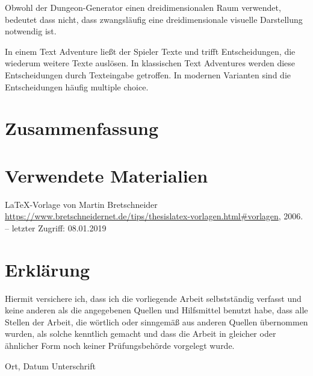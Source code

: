Obwohl der Dungeon-Generator einen dreidimensionalen Raum verwendet, bedeutet dass nicht, dass zwangsläufig eine dreidimensionale visuelle Darstellung notwendig ist.

In einem Text Adventure ließt der Spieler Texte und trifft Entscheidungen, die wiederum weitere Texte auslösen. In klassischen Text Adventures werden diese Entscheidungen durch Texteingabe getroffen. In modernen Varianten sind die Entscheidungen häufig multiple choice.



\chapter{Zusammenfassung}\label{c.zusammenfassung}


\chapter{Verwendete Materialien}

\LaTeX -Vorlage von Martin Bretschneider 
\newblock \url{https://www.bretschneidernet.de/tips/thesislatex-vorlagen.html#vorlagen}, 2006. --
\newblock letzter Zugriff: 08.01.2019





\chapter{Erklärung}

Hiermit versichere ich, dass ich die vorliegende Arbeit selbstständig verfasst und keine anderen als die angegebenen Quellen und Hilfsmittel benutzt habe, dass alle Stellen der Arbeit, die wörtlich oder sinngemäß aus anderen Quellen übernommen wurden, als solche kenntlich gemacht und dass die Arbeit in gleicher oder ähnlicher Form noch keiner Prüfungsbehörde vorgelegt wurde.

\vspace{3cm}
Ort, Datum \hspace{5cm} Unterschrift \\

